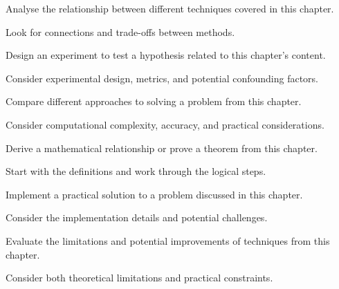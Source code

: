 \begin{exercisebox}[hard]
\begin{problem}
Analyse the relationship between different techniques covered in this chapter.
\end{problem}
\begin{hintbox}
Look for connections and trade-offs between methods.
\end{hintbox}
\end{exercisebox}


\begin{exercisebox}[hard]
\begin{problem}
Design an experiment to test a hypothesis related to this chapter's content.
\end{problem}
\begin{hintbox}
Consider experimental design, metrics, and potential confounding factors.
\end{hintbox}
\end{exercisebox}


\begin{exercisebox}[hard]
\begin{problem}
Compare different approaches to solving a problem from this chapter.
\end{problem}
\begin{hintbox}
Consider computational complexity, accuracy, and practical considerations.
\end{hintbox}
\end{exercisebox}


\begin{exercisebox}[hard]
\begin{problem}
Derive a mathematical relationship or prove a theorem from this chapter.
\end{problem}
\begin{hintbox}
Start with the definitions and work through the logical steps.
\end{hintbox}
\end{exercisebox}


\begin{exercisebox}[hard]
\begin{problem}
Implement a practical solution to a problem discussed in this chapter.
\end{problem}
\begin{hintbox}
Consider the implementation details and potential challenges.
\end{hintbox}
\end{exercisebox}


\begin{exercisebox}[hard]
\begin{problem}
Evaluate the limitations and potential improvements of techniques from this chapter.
\end{problem}
\begin{hintbox}
Consider both theoretical limitations and practical constraints.
\end{hintbox}
\end{exercisebox}

